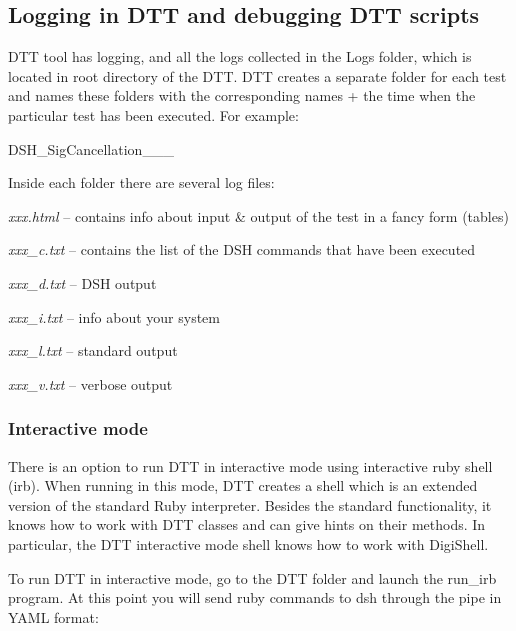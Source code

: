  \hypertarget{a00366_dtt_guide_04_logging_in_dtt_and_debuggin_dtt_scripts}{}\subsection{Logging in D\+T\+T and debugging D\+T\+T scripts}\label{a00366_dtt_guide_04_logging_in_dtt_and_debuggin_dtt_scripts}
 D\+T\+T tool has logging, and all the logs collected in the Logs folder, which is located in root directory of the D\+T\+T. D\+T\+T creates a separate folder for each test and names these folders with the corresponding names + the time when the particular test has been executed. For example\+:

{\ttfamily D\+S\+H\+\_\+\+Sig\+Cancellation\+\_\+\_\+\_}

Inside each folder there are several log files\+: 
\begin{DoxyItemize}
\item {\itshape xxx.\+html} – contains info about input \& output of the test in a fancy form (tables) 
\item {\itshape xxx\+\_\+c.\+txt} – contains the list of the D\+S\+H commands that have been executed 
\item {\itshape xxx\+\_\+d.\+txt} – D\+S\+H output 
\item {\itshape xxx\+\_\+i.\+txt} – info about your system 
\item {\itshape xxx\+\_\+l.\+txt} – standard output 
\item {\itshape xxx\+\_\+v.\+txt} – verbose output 
\end{DoxyItemize}

\hypertarget{a00366_dtt_guide_04_interactive_mode}{}\subsubsection{Interactive mode}\label{a00366_dtt_guide_04_interactive_mode}
 There is an option to run D\+T\+T in interactive mode using interactive ruby shell (irb). When running in this mode, D\+T\+T creates a shell which is an extended version of the standard Ruby interpreter. Besides the standard functionality, it knows how to work with D\+T\+T classes and can give hints on their methods. In particular, the D\+T\+T interactive mode shell knows how to work with Digi\+Shell.

To run D\+T\+T in interactive mode, go to the D\+T\+T folder and launch the {\ttfamily run\+\_\+irb} program. At this point you will send ruby commands to dsh through the pipe in Y\+A\+M\+L format\+:


